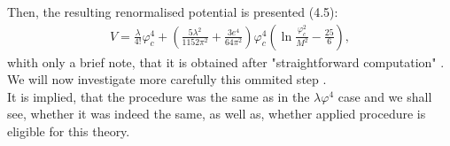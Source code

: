 Then, the resulting renormalised potential is presented \cite{Coleman1973}(4.5):
\begin{align}
V = \frac{\lambda}{4!}\varphi_c^4+\left(\frac{5\lambda^2}{1152\pi^2}+\frac{3e^4}{64\pi^2}\right)
\varphi_c^4\left(\ln\frac{\varphi_c^2}{M^2}-\frac{25}{6}\right),
\end{align}
whith only a brief note, that it is obtained after "straightforward computation" 
.\\
We will now investigate more carefully this ommited step
.\\
It is implied, that the procedure was the same as in the $\lambda\varphi^4$ case and we shall see, 
whether it was indeed the same, as well as, whether applied procedure is eligible for this theory.\\

